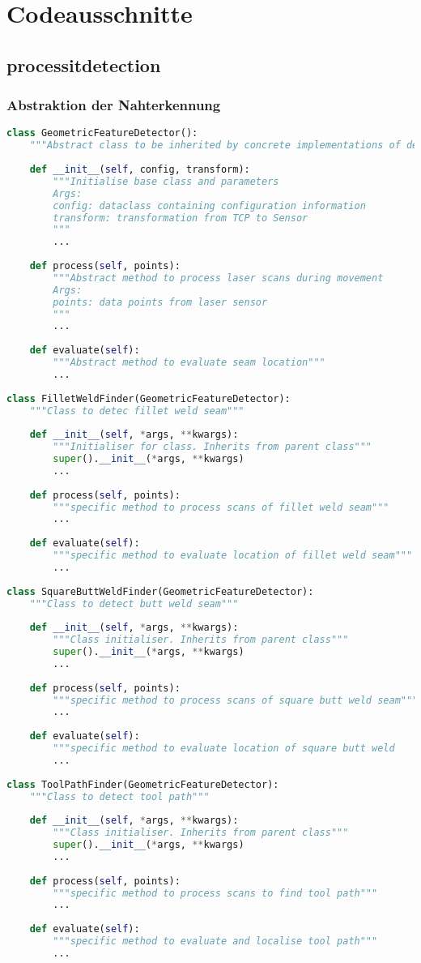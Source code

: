 \appendix
\chapter{Codeausschnitte}
\section{processit\textunderscore detection}
\subsection{Abstraktion der Nahterkennung} \label{a:abstraktion_nahterkennung}
\begin{lstlisting}[language=Python, columns=fullflexible, frame=single, breaklines=true, postbreak=\mbox{\textcolor{red}{$\hookrightarrow$}\space}]
class GeometricFeatureDetector():
	"""Abstract class to be inherited by concrete implementations of detectors"""
	
	def __init__(self, config, transform):
		"""Initialise base class and parameters
		Args:
		config: dataclass containing configuration information
		transform: transformation from TCP to Sensor
		"""
		...
	
	def process(self, points):
		"""Abstract method to process laser scans during movement
		Args:
		points: data points from laser sensor
		"""
		...
		
	def evaluate(self):
		"""Abstract method to evaluate seam location"""
		...
		
class FilletWeldFinder(GeometricFeatureDetector):
	"""Class to detec fillet weld seam"""
	
	def __init__(self, *args, **kwargs):
		"""Initialiser for class. Inherits from parent class"""
		super().__init__(*args, **kwargs)
		...
		
	def process(self, points):
		"""specific method to process scans of fillet weld seam"""
		...
		
	def evaluate(self):
		"""specific method to evaluate location of fillet weld seam"""
		...
		
class SquareButtWeldFinder(GeometricFeatureDetector):
	"""Class to detect butt weld seam"""
	
	def __init__(self, *args, **kwargs):
		"""Class initialiser. Inherits from parent class"""
		super().__init__(*args, **kwargs)
		...
		
	def process(self, points):
		"""specific method to process scans of square butt weld seam"""
		...
		
	def evaluate(self):
		"""specific method to evaluate location of square butt weld 	seam"""
		...
		
class ToolPathFinder(GeometricFeatureDetector):
	"""Class to detect tool path"""
	
	def __init__(self, *args, **kwargs):
		"""Class initialiser. Inherits from parent class"""
		super().__init__(*args, **kwargs)
		...
		
	def process(self, points):
		"""specific method to process scans to find tool path"""
		...
		
	def evaluate(self):
		"""specific method to evaluate and localise tool path"""
		...

\end{lstlisting}
